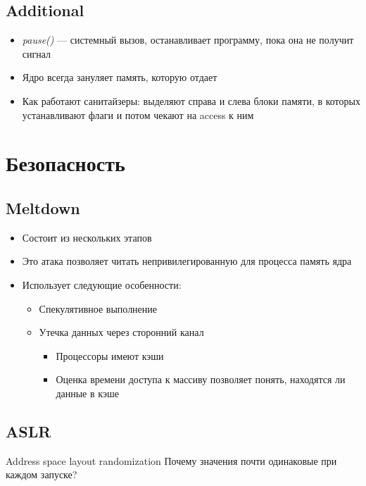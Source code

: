 \documentclass[../../lectures.tex]{subfiles}
\begin{document}

\subsection{Additional}
\begin{itemize}
    \item \emph{pause()} --- системный вызов, останавливает программу, пока она не получит сигнал

    \item Ядро всегда зануляет память, которую отдает

    \item Как работают санитайзеры: выделяют справа и слева блоки памяти, 
          в которых устанавливают флаги и потом чекают на access к ним
\end{itemize}

\section{Безопасность}
\subsection{Meltdown}
\begin{itemize}
    \item Состоит из нескольких этапов
    \item Это атака позволяет читать непривилегированную для процесса память ядра
    \item Использует следующие особенности:
          \begin{itemize}
              \item Спекулятивное выполнение
              \item Утечка данных через сторонний канал
                  \begin{itemize}
                      \item Процессоры имеют кэши
                      \item Оценка времени доступа к массиву позволяет понять, находятся ли данные в кэше
                  \end{itemize}
          \end{itemize}
\end{itemize}

\subsection{ASLR}
Address space layout randomization
Почему значения почти одинаковые при каждом запуске?
\end{document}
